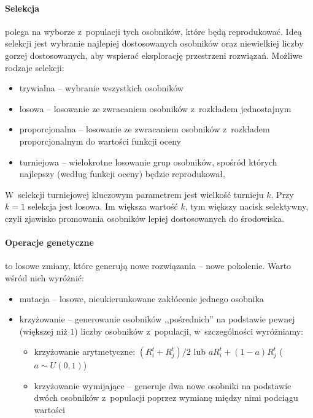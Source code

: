 \documentclass[a4paper,onecolumn,oneside,12pt]{mwart}
\begin{document}
\paragraph{Selekcja} polega na wyborze z~populacji tych osobników, które będą
reprodukować. Ideą selekcji jest wybranie najlepiej dostosowanych osobników
oraz niewielkiej liczby gorzej dostosowanych, aby wspierać eksplorację
przestrzeni rozwiązań. Możliwe rodzaje selekcji:
\begin{itemize}
	\item trywialna -- wybranie wszystkich osobników
	\item losowa -- losowanie ze zwracaniem osobników z~rozkładem jednostajnym
	\item proporcjonalna -- losowanie ze zwracaniem osobników z~rozkładem
		proporcjonalnym do wartości funkcji oceny
	\item turniejowa -- wielokrotne losowanie grup osobników, spośród
		których najlepszy (według funkcji oceny) będzie reprodukował,
\end{itemize}

W~selekcji turniejowej kluczowym parametrem jest wielkość turnieju $k$.
Przy $k = 1$ selekcja jest losowa. Im większa wartość $k$, tym większy
nacisk selektywny, czyli zjawisko promowania osobników lepiej dostosowanych
do środowiska.

\paragraph{Operacje genetyczne} to losowe zmiany, które generują nowe
rozwiązania -- nowe pokolenie. Warto wśród nich wyróżnić:

\begin{itemize}
	\item mutacja -- losowe, nieukierunkowane zakłócenie jednego osobnika
	\item krzyżowanie -- generowanie osobników ,,pośrednich'' na podstawie
		pewnej (większej niż $1$) liczby osobników z~populacji,
		w~szczególności wyróżniamy:
		\begin{itemize}
			\item krzyżowanie arytmetyczne: $(R_i^t + R_j^t)/2$ lub $aR_i^t
				+ (1-a)R_j^t$ ($a \sim U(0,1)$)
			\item krzyżowanie wymijające -- generuje dwa nowe osobniki na
				podstawie dwóch osobników z~populacji poprzez wymianę
				między nimi podciągu wartości
		\end{itemize}
\end{itemize}
\end{document}
